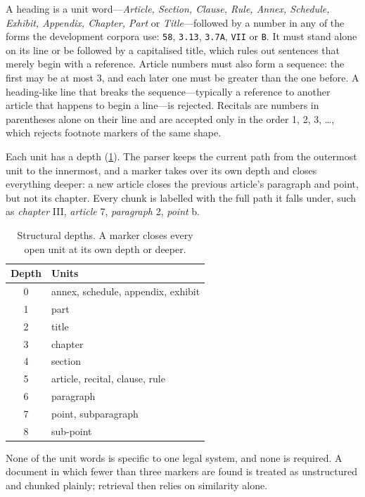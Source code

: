 A heading is a unit word---\emph{Article, Section, Clause, Rule, Annex,
Schedule, Exhibit, Appendix, Chapter, Part} or \emph{Title}---followed by a
number in any of the forms the development corpora use: \texttt{58},
\texttt{3.13}, \texttt{3.7A}, \texttt{VII} or \texttt{B}. It must stand alone
on its line or be followed by a capitalised title, which rules out sentences
that merely begin with a reference. Article numbers must also form a sequence:
the first may be at most 3, and each later one must be greater than the one
before. A heading-like line that breaks the sequence---typically a reference
to another article that happens to begin a line---is rejected. Recitals are
numbers in parentheses alone on their line and are accepted only in the order
1, 2, 3, \ldots, which rejects footnote markers of the same shape.

Each unit has a depth (\cref{tab:depths}). The parser keeps the current path
from the outermost unit to the innermost, and a marker takes over its own
depth and closes everything deeper: a new article closes the previous
article's paragraph and point, but not its chapter. Every chunk is labelled
with the full path it falls under, such as \emph{chapter} III, \emph{article}
7, \emph{paragraph} 2, \emph{point} b.

\begin{table}[ht]
\centering
\small
\begin{tabular}{@{}cl@{}}
\toprule
Depth & Units \\
\midrule
0 & annex, schedule, appendix, exhibit \\
1 & part \\
2 & title \\
3 & chapter \\
4 & section \\
5 & article, recital, clause, rule \\
6 & paragraph \\
7 & point, subparagraph \\
8 & sub-point \\
\bottomrule
\end{tabular}
\caption{Structural depths. A marker closes every open unit at its own depth
or deeper.}
\label{tab:depths}
\end{table}

None of the unit words is specific to one legal system, and none is required.
A document in which fewer than three markers are found is treated as
unstructured and chunked plainly; retrieval then relies on similarity alone.

